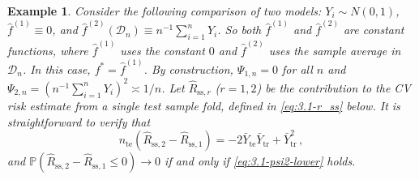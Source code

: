 \documentclass[11pt]{article}
\theoremstyle{plain}
\newtheorem{example}[theorem]{Example}
\newcommand{\ssp}{{\mathrm{ss}}}
\newcommand{\tr}{{\mathrm{tr}}}
\newcommand{\te}{{\mathrm{te}}}
\newcommand{\D}{{\mathcal{D}}}
\begin{document}
\begin{example}\label{exa:3.1-simple-example}
    Consider the following comparison of two models: $Y_i\sim N(0,1)$,
    $\hat f^{(1)}\equiv 0$, and $\hat f^{(2)}(\D_n) \equiv n^{-1}\sum_{i=1}^n Y_i$. So both $\hat f^{(1)}$ and $\hat f^{(2)}$ are constant functions, where $\hat f^{(1)}$ uses the constant $0$ and $\hat f^{(2)}$ uses the sample average in $\D_n$. In this case, $f^*=\hat f^{(1)}$.  By construction, $\Psi_{1,n}=0$ for all $n$ and $\Psi_{2,n}=(n^{-1}\sum_{i=1}^n Y_i)^2\asymp 1/n$. Let $\hat R_{\ssp,r}$ ($r=1,2$) be the contribution to the CV risk estimate from a single test sample fold, defined in \eqref{eq:3.1-r_ss} below.  It is straightforward to verify that
    $$n_\te(\hat R_{\ssp,2}-\hat R_{\ssp,1})=-2\bar Y_\te\bar Y_\tr + \bar Y_\tr^2\,,$$
    and $\mathbb P(\hat R_{\ssp,2}-\hat R_{\ssp,1}\le 0)\rightarrow 0$ if and only if \eqref{eq:3.1-psi2-lower} holds.
\end{example}
\end{document}
